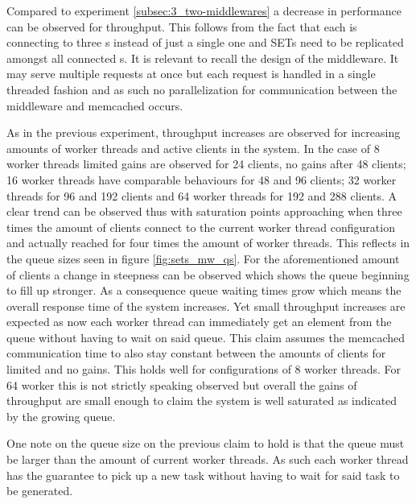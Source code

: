             Compared to experiment \ref{subsec:3_two-middlewares} a decrease in performance can be observed for
            throughput. This follows from the fact that each \mw{} is connecting to three \srv{}s instead of just a
            single one and SETs need to be replicated amongst all connected \srv{}s. It is relevant to recall the design
            of the middleware. It may serve multiple requests at once but each request is handled in a single threaded
            fashion and as such no parallelization for communication between the middleware and memcached occurs.

            As in the previous experiment, throughput increases are observed for increasing amounts of worker threads
            and active clients in the system. In the case of 8 worker threads limited gains are observed for 24 clients,
            no gains after 48 clients; 16 worker threads have comparable behaviours for 48 and 96 clients; 32 worker
            threads for 96 and 192 clients and 64 worker threads for 192 and 288 clients. A clear trend can be observed
            thus with saturation points approaching when three times the amount of clients connect to the current worker
            thread configuration and actually reached for four times the amount of worker threads. This reflects in the
            queue sizes seen in figure \ref{fig:sets_mw_qs}. For the aforementioned amount of clients a change in
            steepness can be observed which shows the queue beginning to fill up stronger. As a consequence queue
            waiting times grow which means the overall response time of the system increases. Yet small throughput
            increases are expected as now each worker thread can immediately get an element from the queue without
            having to wait on said queue. This claim assumes the memcached communication time to also stay constant
            between the amounts of clients for limited and no gains. This holds well for configurations of 8 worker threads. For 64 worker this is not strictly speaking observed but overall the gains of throughput
            are small enough to claim the system is well saturated as indicated by the growing queue.

            One note on the queue size on the previous claim to hold is that the queue must be larger than the amount of
            current worker threads. As such each worker thread has the guarantee to pick up a new task without having
            to wait for said task to be generated.

